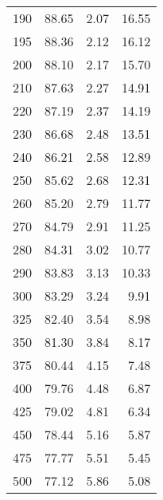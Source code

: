 \begin{table}[ht]
\begin{tabular}{rrrr}
  190 & 88.65 & 2.07 & 16.55 \\ 
  195 & 88.36 & 2.12 & 16.12 \\ 
  200 & 88.10 & 2.17 & 15.70 \\ 
  210 & 87.63 & 2.27 & 14.91 \\ 
  220 & 87.19 & 2.37 & 14.19 \\ 
  230 & 86.68 & 2.48 & 13.51 \\ 
  240 & 86.21 & 2.58 & 12.89 \\ 
  250 & 85.62 & 2.68 & 12.31 \\ 
  260 & 85.20 & 2.79 & 11.77 \\ 
  270 & 84.79 & 2.91 & 11.25 \\ 
  280 & 84.31 & 3.02 & 10.77 \\ 
  290 & 83.83 & 3.13 & 10.33 \\ 
  300 & 83.29 & 3.24 & 9.91 \\ 
  325 & 82.40 & 3.54 & 8.98 \\ 
  350 & 81.30 & 3.84 & 8.17 \\ 
  375 & 80.44 & 4.15 & 7.48 \\ 
  400 & 79.76 & 4.48 & 6.87 \\ 
  425 & 79.02 & 4.81 & 6.34 \\ 
  450 & 78.44 & 5.16 & 5.87 \\ 
  475 & 77.77 & 5.51 & 5.45 \\ 
  500 & 77.12 & 5.86 & 5.08 \\ 
   \hline
\end{tabular}
\end{table}
